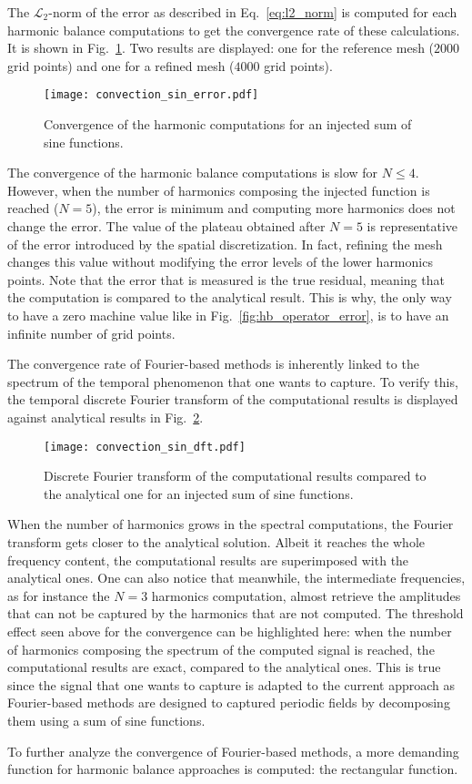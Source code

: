 The $\mathcal{L}_2$-norm of the error as described
in Eq.~\eqref{eq:l2_norm} is computed for each harmonic balance
computations to get the convergence rate of these calculations. It is
shown in Fig.~\ref{fig:conv_sum_sine}. Two results are displayed:
one for the reference mesh ($2000$ grid points) and one for
a refined mesh ($4000$ grid points).
\begin{figure}[htbp]
  \centering
  \texttt{[image: convection\_sin\_error.pdf]}
  \caption{Convergence of the harmonic computations for an injected sum of sine functions.}
  \label{fig:conv_sum_sine}
\end{figure}
The convergence of the harmonic balance computations is slow  for
$N \leq 4$. However, when the number of harmonics composing
the injected function is reached ($N=5$), the error is minimum and computing
more harmonics does not change the error. 
The value of the plateau obtained 
after $N=5$ is representative of the error introduced by the spatial
discretization. In fact, refining the mesh changes this value
without modifying the error levels of the lower harmonics points.
Note that the error that is measured is the true residual, meaning
that the computation is compared to the analytical result.
This is why, the only way to have a zero machine value like in
Fig.~\ref{fig:hb_operator_error}, is to have an infinite number of grid points.

The convergence rate 
of Fourier-based methods is inherently linked to the spectrum of the
temporal phenomenon that one wants to capture.
To verify this, the temporal discrete Fourier transform
of the computational results is displayed against 
analytical results in Fig.~\ref{fig:dft_sin}.
\begin{figure}[htbp]
  \centering
  \texttt{[image: convection\_sin\_dft.pdf]}
  \caption{Discrete Fourier transform of the computational
  results compared to the analytical one for an injected sum of sine
  functions.}
  \label{fig:dft_sin}
\end{figure}
When the number of harmonics grows in the spectral computations,
the Fourier transform gets closer to the analytical solution.
Albeit it reaches the whole frequency content, the computational
results are superimposed with the analytical ones. One can also
notice that meanwhile, the intermediate frequencies, as for 
instance the $N=3$ harmonics computation, almost retrieve 
the amplitudes that can not be captured by the harmonics that are
not computed. The threshold effect seen above for the convergence can be highlighted
here: when the number of harmonics composing the spectrum of the
computed signal is reached, the computational results are exact, compared
to the analytical ones. This is true since the signal that
one wants to capture is adapted to the current approach as Fourier-based methods
are designed to captured periodic fields by decomposing them
using a sum of sine functions. 

To further analyze the convergence of Fourier-based methods, a more
demanding function for harmonic balance approaches is computed: the
rectangular function.